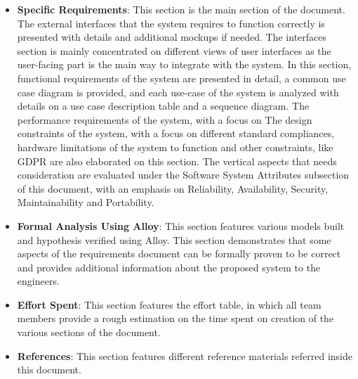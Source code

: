 \begin{itemize}
    \item \textbf{Specific Requirements}: This section is the main section of the document.
        The external interfaces that the system requires to function correctly is presented with details and additional mockups if needed.
        The interfaces section is mainly concentrated on different views of user interfaces as the user-facing part is the main way to integrate with the system.
        In this section, functional requirements of the system are presented in detail, a common use case diagram is provided, and each use-case of the system is analyzed with details on a use case description table and a sequence diagram.
        The performance requirements of the system, with a focus on %
        The design constraints of the system, with a focus on different standard compliances, hardware limitations of the system to function and other constraints, like GDPR are also elaborated on this section.
        The vertical aspects that needs consideration are evaluated under the Software System Attributes subsection of this document, with an emphasis on Reliability, Availability, Security, Maintainability and Portability.

    \item \textbf{Formal Analysis Using Alloy}: This section features various models built and hypothesis verified using Alloy.
        This section demonstrates that some aspects of the requirements document can be formally proven to be correct and provides additional information about the proposed system to the engineers.
    \item \textbf{Effort Spent}: This section features the effort table, in which all team members provide a rough estimation on the time spent on creation of the various sections of the document.
    \item \textbf{References}: This section features different reference materials referred inside this document.
\end{itemize}

